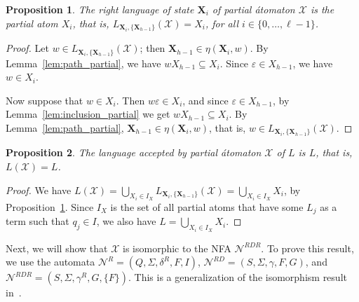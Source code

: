 \documentclass[preprint,12pt]{elsarticle}
\newcommand{\eps}{\varepsilon}
\newcommand{\Sig}{\Sigma}
\newcommand{\cN}{{\mathcal N}}
\newcommand{\cX}{{\mathcal X}}
\newcommand{\rev}{R}
\newcommand{\deter}{D}
\newtheorem{proposition}{Proposition}
\begin{document}
\begin{proposition}
\label{prop:right_lang_partial}
The right language of state ${\mathbf X}_i$ of partial \'atomaton $\cX$ is 
the partial atom $X_i$, that is, 
$L_{{\mathbf X}_i,\{{\mathbf X}_{h-1}\}}(\cX)=X_i$, for all $i\in\{0,\ldots,\ell-1\}$.
\end{proposition}
\begin{proof}  
Let $w\in L_{{\mathbf X}_i,\{{\mathbf X}_{h-1}\}}(\cX)$; then 
${\mathbf X}_{h-1}\in \eta({\mathbf X}_i,w)$.
By Lemma~\ref{lem:path_partial}, we have $wX_{h-1} \subseteq X_i$.  
Since $\eps\in X_{h-1}$,  we have $w\in X_i$. 

Now suppose that $w\in X_i$. Then $w\eps\in X_i$, and since $\eps\in X_{h-1}$,
by Lemma~\ref{lem:inclusion_partial} we get $wX_{h-1}\subseteq X_i$. 
By Lemma~\ref{lem:path_partial}, 
${\mathbf X}_{h-1} \in\eta({\mathbf X}_i,w)$, that is, 
$w\in L_{{\mathbf X}_i,\{{\mathbf X}_{h-1}\}}(\cX)$. 
\end{proof}

\begin{proposition}
\label{prop:lang_partial_atomaton}
The language accepted by partial \'atomaton $\cX$ of $L$ is $L$,
that is, $L(\cX)=L$.
\end{proposition}
\begin{proof}
We have $L(\cX)=\bigcup_{X_i\in I_X} L_{{\mathbf X}_i,\{{\mathbf X}_{h-1}\}}(\cX)= 
\bigcup_{X_i\in I_X}X_i$, by Proposition~\ref{prop:right_lang_partial}.
Since $I_X$ is the set of all partial atoms that have some $L_j$ as a term 
such that $q_j\in I$, we also have $L=\bigcup_{X_i\in I_X}X_i$. 
\end{proof}


Next, we will show that $\cX$ is isomorphic to the NFA $\cN^{\rev\deter\rev}$. 
To prove this result, we use the automata 
$\cN^\rev=(Q,\Sig,\delta^\rev, F,I)$,
$\cN^{\rev\deter}=(S,\Sig,\gamma, F, G)$, and
$\cN^{\rev\deter\rev}=(S,\Sig,\gamma^\rev, G, \{F\})$.
This is a generalization of the isomorphism result in~\cite{BrTa13}.
\end{document}
